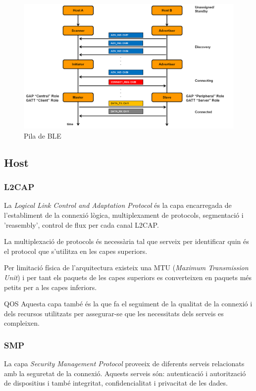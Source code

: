 \begin{figure}[h]
	\begin{center}
		\includegraphics[width=1\textwidth]{./images/rols_unicast.png}
		\caption{Pila de BLE \cite{ble_stack}}
		\label{ble_stack}
	\end{center}
\end{figure}


\subsection{Host}
\subsubsection{L2CAP}
La \textit{Logical Link Control and Adaptation Protocol} és la capa encarregada de l'establiment de la connexió lògica, multiplexament de protocols, segmentació i 'reasembly', control de flux per cada canal L2CAP.

La multiplexació de protocols és necessària tal que serveix per identificar quin és el protocol que s'utilitza en les capes superiors.

Per limitació física de l'arquitectura existeix una MTU (\textit{Maximum Transmission Unit}) i per tant els paquets de les capes superiors es converteixen en paquets més petits per a les capes inferiors.

QOS Aquesta capa també és la que fa el seguiment de la qualitat de la connexió i dels recursos utilitzats per assegurar-se que les necessitats dels serveis es compleixen.

\subsubsection{SMP}
La capa \textit{Security Management Protocol} proveeix de diferents serveis relacionats amb la seguretat de la connexió.
Aquests serveis són: autenticació i autorització de dispositius i també integritat, confidencialitat i privacitat de les dades.


